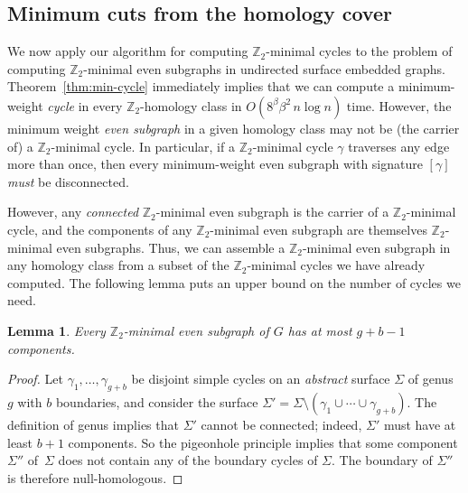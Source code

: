 \documentclass[11pt,twoside]{article}
\def\Z{\mathbb{Z}}
\newtheorem{lemma}[theorem]{Lemma}
\begin{document}
{%
\subsection{Minimum cuts from the homology cover}
\label{sec:homcover_mincut}

We now apply our algorithm for computing $\Z_2$-minimal cycles to the problem of computing $\Z_2$-minimal even subgraphs in undirected surface embedded graphs.
Theorem~\ref{thm:min-cycle} immediately implies that we can compute a minimum-weight \emph{cycle} in every $\Z_2$-homology class in $O(8^\beta \beta^2\, n\log n)$ time.  However, the minimum weight \emph{even subgraph} in a given homology class may not be (the carrier of) a $\Z_2$-minimal cycle.  In particular, if a $\Z_2$-minimal cycle $\gamma$ traverses any edge more than once, then every minimum-weight even subgraph with signature $[\gamma]$ \emph{must} be disconnected.

However, any \emph{connected} $\Z_2$-minimal even subgraph is the carrier of a $\Z_2$-minimal cycle, and the components of any $\Z_2$-minimal even subgraph are themselves $\Z_2$-minimal even subgraphs.  Thus, we can assemble a $\Z_2$-minimal even subgraph in any homology class from a subset of the $\Z_2$-minimal cycles we have already computed.  The following lemma puts an upper bound on the number of cycles we need.

\begin{lemma}
\label{lem:even-comps}
Every $\Z_2$-minimal even subgraph of $G$ has at most $g+b-1$ components.
\end{lemma}

\begin{proof}
Let $\gamma_1, \dots, \gamma_{g+b}$ be disjoint simple cycles on an \emph{abstract} surface $\Sigma$ of genus $g$ with $b$ boundaries, and consider the surface $\Sigma' = \Sigma \setminus (\gamma_1 \cup \cdots \cup \gamma_{g+b})$.  The definition of genus implies that $\Sigma'$ cannot be connected; indeed, $\Sigma'$ must have at least $b+1$ components.  So the pigeonhole principle implies that some component $\Sigma''$ of~$\Sigma$ does not contain any of the boundary cycles of $\Sigma$.  The boundary of $\Sigma''$ is therefore null-homologous.


\end{proof}}
\end{document}
